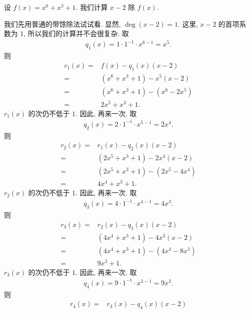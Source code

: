 \begin{example}
    设 $f(x) = x^6 + x^3 + 1$. 我们计算 $x - 2$ 除 $f(x)$.

    我们先用普通的带馀除法试试看. 显然, $\deg {(x-2)} = 1$. 这里, $x - 2$ 的首项系数为 $1$, 所以我们的计算并不会很复杂. 取
    \begin{align*}
        q_1 (x) = 1 \cdot 1^{-1} \cdot x^{6-1} = x^5.
    \end{align*}
    则
    \begin{align*}
        r_1 (x)
        = {} & f(x) - q_1 (x) (x - 2)         \\
        = {} & (x^6 + x^3 + 1) - x^5 (x - 2)  \\
        = {} & (x^6 + x^3 + 1) - (x^6 - 2x^5) \\
        = {} & 2x^5 + x^3 + 1.
    \end{align*}
    $r_1 (x)$ 的次仍不低于 $1$. 因此, 再来一次. 取
    \begin{align*}
        q_2 (x) = 2 \cdot 1^{-1} \cdot x^{5-1} = 2x^4.
    \end{align*}
    则
    \begin{align*}
        r_2 (x)
        = {} & r_1 (x) - q_2 (x) (x - 2)        \\
        = {} & (2x^5 + x^3 + 1) - 2x^4 (x - 2)  \\
        = {} & (2x^5 + x^3 + 1) - (2x^5 - 4x^4) \\
        = {} & 4x^4 + x^3 + 1.
    \end{align*}
    $r_2 (x)$ 的次仍不低于 $1$. 因此, 再来一次. 取
    \begin{align*}
        q_3 (x) = 4 \cdot 1^{-1} \cdot x^{4-1} = 4x^3.
    \end{align*}
    则
    \begin{align*}
        r_3 (x)
        = {} & r_2 (x) - q_3 (x) (x - 2)        \\
        = {} & (4x^4 + x^3 + 1) - 4x^3 (x - 2)  \\
        = {} & (4x^4 + x^3 + 1) - (4x^4 - 8x^3) \\
        = {} & 9x^3 + 1.
    \end{align*}
    $r_3 (x)$ 的次仍不低于 $1$. 因此, 再来一次. 取
    \begin{align*}
        q_4 (x) = 9 \cdot 1^{-1} \cdot x^{3-1} = 9x^2.
    \end{align*}
    则
    \begin{align*}
        r_4 (x)
        = {} & r_3 (x) - q_4 (x) (x - 2)   \\

\end{align*}
\end{example}
